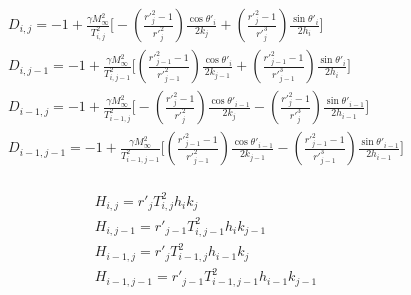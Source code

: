 \documentclass[a4paper]{article}
\begin{document}
	\begin{equation}
		\begin{split}
		D_{i,j} = -1 + \frac{\gamma M_\infty^2}{T_{i,j}^2}
		\Biggl[
			-
			\left(
				\frac{r'^2_j - 1}{r'^2_j}
			\right)
			 \frac{\cos \theta '_i}{2k_j}
			+ 			
			\left(
				\frac{r'^2_j - 1}{r'^3_j}
			\right)
			 \frac{\sin \theta '_i}{2h_i}
		\Biggr] \\
		D_{i,j-1} = -1 + \frac{\gamma M_\infty^2}{T_{i,j-1}^2}
		\Biggl[
			\left(
				\frac{r'^2_{j-1} - 1}{r'^2_{j-1}}
			\right)
			 \frac{\cos \theta '_i}{2k_{j-1}}
			+ 			
			\left(
				\frac{r'^2_{j-1} - 1}{r'^3_{j-1}}
			\right)
			 \frac{\sin \theta '_i}{2h_i}
		\Biggr] \\
		D_{i-1,j} = -1 + \frac{\gamma M_\infty^2}{T_{i-1,j}^2}
		\Biggl[
			- 
			\left(
				\frac{r'^2_j - 1}{r'^2_j}
			\right)
			 \frac{\cos \theta '_{i-1}}{2k_j}
			- 			
			\left(
				\frac{r'^2_j - 1}{r'^3_j}
			\right)
			 \frac{\sin \theta '_{i-1}}{2h_{i-1}}
		\Biggr] \\
		D_{i-1,j-1} = -1 + \frac{\gamma M_\infty^2}{T_{i-1,j-1}^2}
		\Biggl[
			\left(
				\frac{r'^2_{j-1} - 1}{r'^2_{j-1}}
			\right)
			 \frac{\cos \theta '_{i-1}}{2k_{j-1}}
			-		
			\left(
				\frac{r'^2_{j-1} - 1}{r'^3_{j-1}}
			\right)
			 \frac{\sin \theta '_{i-1}}{2h_{i-1}}
		\Biggr] \\
		\end{split}
	\end{equation}
	
	\begin{equation}
		\begin{split}
			H_{i,j} = r'_j T_{i,j}^2 h_i k_j \\
			H_{i,j-1} = r'_{j-1} T_{i,j-1}^2 h_i k_{j-1} \\
			H_{i-1,j} = r'_j T_{i-1,j}^2 h_{i-1} k_j \\
			H_{i-1,j-1} = r'_{j-1} T_{i-1,j-1}^2 h_{i-1} k_{j-1} 
		\end{split}
	\end{equation}
	
	
	
\end{document}
